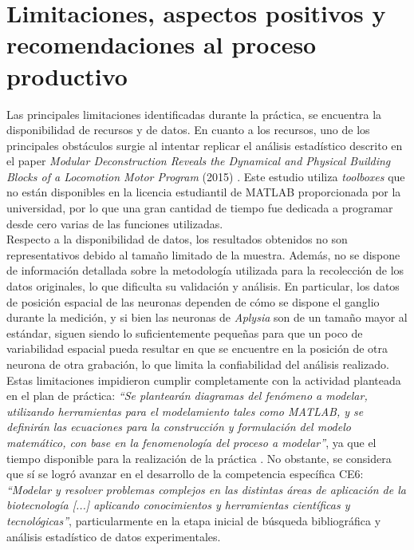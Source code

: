 \section{Limitaciones, aspectos positivos y recomendaciones al proceso productivo}

Las principales limitaciones identificadas durante la práctica, se encuentra la disponibilidad de recursos y de datos. En cuanto a los recursos, uno de los principales obstáculos surgie al intentar replicar el análisis estadístico descrito en el paper \textit{Modular Deconstruction Reveals the Dynamical and Physical Building Blocks of a Locomotion Motor Program} (2015) \cite{AMB}. Este estudio utiliza \textit{toolboxes} que no están disponibles en la licencia estudiantil de MATLAB proporcionada por la universidad, por lo que una gran cantidad de tiempo fue dedicada a programar desde cero varias de las funciones utilizadas.\\

Respecto a la disponibilidad de datos, los resultados obtenidos no son representativos debido al tamaño limitado de la muestra. Además, no se dispone de información detallada sobre la metodología utilizada para la recolección de los datos originales, lo que dificulta su validación y análisis. En particular, los datos de posición espacial de las neuronas dependen de cómo se dispone el ganglio durante la medición, y si bien las neuronas de \textit{Aplysia} son de un tamaño mayor al estándar, siguen siendo lo suficientemente pequeñas para que un poco de variabilidad espacial pueda resultar en que se encuentre en la posición de otra neurona de otra grabación, lo que limita la confiabilidad del análisis realizado.\\

Estas limitaciones impidieron cumplir completamente con la actividad planteada en el plan de práctica: \textit{``Se plantearán diagramas del fenómeno a modelar, utilizando herramientas para el modelamiento tales como MATLAB, y se definirán las ecuaciones para la construcción y formulación del modelo matemático, con base en la fenomenología del proceso a modelar''}, ya que el tiempo disponible para la realización de la práctica . No obstante, se considera que sí se logró avanzar en el desarrollo de la competencia específica CE6: \textit{``Modelar y resolver problemas complejos en las distintas áreas de aplicación de la biotecnología [...] aplicando conocimientos y herramientas científicas y tecnológicas''}, particularmente en la etapa inicial de búsqueda bibliográfica y análisis estadístico de datos experimentales.\\

